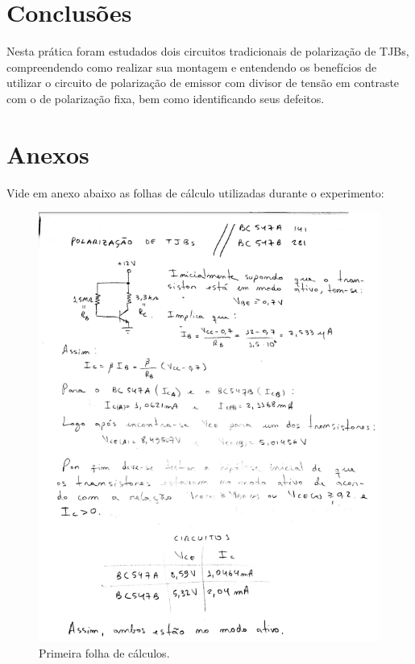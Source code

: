 \section{Conclusões}

Nesta prática foram estudados dois circuitos tradicionais de polarização de TJBs, compreendendo como realizar sua montagem e entendendo os benefícios de utilizar o circuito de polarização de emissor com divisor de tensão em contraste com o de polarização fixa, bem como identificando seus defeitos.

\newpage

\section{Anexos}
Vide em anexo abaixo as folhas de cálculo utilizadas durante o experimento:

\begin{figure}[h!] 
\includegraphics[scale=1]{imagens/calc1.png} 
\centering
\caption{Primeira folha de cálculos.}
\label{calc:1} 
\end{figure} 

